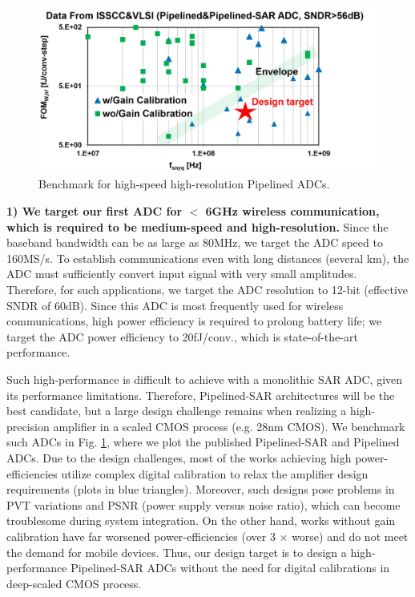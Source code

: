 \begin{figure}[!]
\centering
  \includegraphics[width=1\textwidth]{figure/chap1/target.jpg}
  \caption{Benchmark for high-speed high-resolution Pipelined ADCs.}
  \label{target}
\end{figure}

\textbf{1) We target our first ADC for $<$ 6GHz wireless communication, which is required to be medium-speed and high-resolution.}
Since the baseband bandwidth can be as large as 80MHz, we target the ADC speed to 160MS/s.
To establish communications even with long distances (several km), the ADC must sufficiently convert input signal with very small amplitudes.
Therefore, for such applications, we target the ADC resolution to 12-bit (effective SNDR of 60dB).
Since this ADC is most frequently used for wireless communications, high power efficiency is required to prolong battery life; we target the ADC power efficiency to 20fJ/conv., which is state-of-the-art performance.

Such high-performance is difficult to achieve with a monolithic SAR ADC, given its performance limitations. Therefore, Pipelined-SAR architectures will be the best candidate, but a large design challenge remains when realizing a high-precision amplifier in a scaled CMOS process (e.g. 28nm CMOS). We benchmark such ADCs in Fig. \ref{target}, where we plot the published Pipelined-SAR and Pipelined ADCs. Due to the design challenges, most of the works achieving high power-efficiencies utilize complex digital calibration to relax the amplifier design requirements (plots in blue triangles). Moreover, such designs pose problems in PVT variations and PSNR (power supply versus noise ratio), which can become troublesome during system integration. 
On the other hand, works without gain calibration have far worsened power-efficiencies (over 3 $\times$ worse) and do not meet the demand for mobile devices.  Thus, our design target is to design a high-performance Pipelined-SAR ADCs without the need for digital calibrations in deep-scaled CMOS process.

